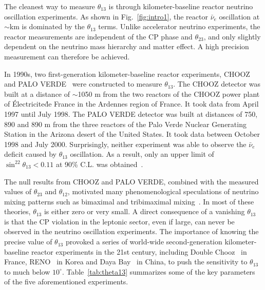 \documentclass[aps,twocolumn,preprintnumbers,amsmath,superscriptaddress,amssymb,floats,nofootinbib]{revtex4-1}
\begin{document}
The cleanest way to measure $\theta_{13}$ is through kilometer-baseline reactor neutrino oscillation experiments. As shown in Fig.~\ref{fig:intro1}, the reactor $\bar\nu_e$ oscillation at $\sim$km is dominated by the $\theta_{13}$ terms. Unlike accelerator neutrino experiments, the reactor measurements are independent of the CP phase and $\theta_{23}$, and only slightly dependent on the neutrino mass hierarchy and matter effect. A high precision measurement can therefore be achieved.

In 1990s, two first-generation kilometer-baseline reactor experiments, CHOOZ~\cite{Chooz} and PALO VERDE~\cite{Paloverde} were constructed to measure $\theta_{13}$. 
The CHOOZ detector was built at a distance of $\sim$1050 m from the two reactors of the CHOOZ power plant of \'{E}lectricite\'{d}e France in the Ardennes region of France. It took data from April 1997 until July 1998. 
The PALO VERDE detector was built at distances of 750, 890 and 890 m from the three reactors of the Palo Verde Nuclear Generating Station in the Arizona desert of the United States. It took data between October 1998 and July 2000. 
Surprisingly, neither experiment was able to observe the $\bar\nu_e$ deficit caused by $\theta_{13}$ oscillation. 
As a result, only an upper limit of $\sin^22\theta_{13} < 0.11$ at 90\% C.L. was obtained~\cite{Chooz}.

The null results from CHOOZ and PALO VERDE, combined with the measured values of $\theta_{23}$ and $\theta_{12}$, motivated many phenomenological speculations of neutrino mixing patterns such as bimaximal and tribimaximal mixing~\cite{Harrison,Altarelli}. 
In most of these theories, $\theta_{13}$ is either zero or very small. 
A direct consequence of a vanishing $\theta_{13}$ is that the CP violation in the leptonic sector, even if large, can never be observed in the neutrino oscillation experiments. 
The importance of knowing the precise value of $\theta_{13}$ provoked a series of world-wide second-generation kilometer-baseline reactor experiments in the 21st century, including Double Chooz~\cite{DChooz} in France, RENO~\cite{Reno} in Korea and Daya Bay~\cite{Dayabay} in China, to push the sensitivity to $\theta_{13}$ to much below $10^\circ$. 
Table~\ref{tab:theta13} summarizes some of the key parameters of the five aforementioned experiments.
\end{document}
